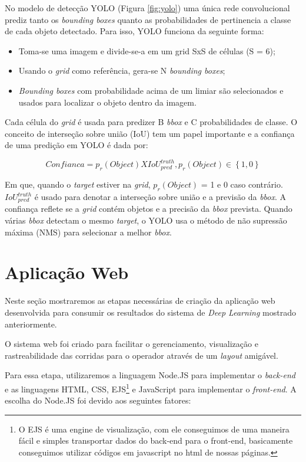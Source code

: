 No modelo de detecção YOLO (Figura \ref{fig:yolo}) uma única rede convolucional prediz tanto os \textit{bounding boxes} quanto as probabilidades de pertinencia a classe de cada objeto detectado. Para isso, YOLO funciona da seguinte forma:

\begin{itemize}
    \item Toma-se uma imagem e divide-se-a em um grid SxS de células (S = 6);
    \item Usando o \textit{grid} como referência, gera-se N \textit{bounding boxes};
    \item \textit{Bounding boxes} com probabilidade acima de um limiar são selecionados e usados para localizar o objeto dentro da imagem.
\end{itemize}

Cada célula do  \textit{grid} é usada para predizer B  \textit{bbox} e C probabilidades de classe. O conceito de interseção sobre união (IoU) tem um papel importante e a confiança de uma predição em YOLO é dada por:

\begin{equation}
    Confianca = p_r(Object) X IoU_{pred}^{truth} , p_r(Object) \in \left \{ 1\right.,\left.0\right \}
\end{equation}

Em que, quando o \textit{target} estiver na \textit{grid}, \(p_r(Object)\) = 1 e 0 caso contrário. \(IoU_{pred}^{truth}\) é usado para denotar a interseção sobre união e a previsão da \textit{bbox}. A confiança reflete se a \textit{grid} contém objetos e a precisão da \textit{bbox} prevista. Quando várias \textit{bbox} detectam o mesmo \textit{target}, o YOLO usa o método de não supressão máxima (NMS) para selecionar a melhor \textit{bbox}.


\section{Aplicação Web} \label{sec:web}

Neste seção mostraremos as etapas necessárias de criação da aplicação web desenvolvida para consumir os resultados do sistema de \textit{Deep Learning} mostrado anteriormente. 

O sistema web foi criado para facilitar o gerenciamento, visualização e rastreabilidade das corridas para o operador através de um \textit{layout} amigável.

Para essa etapa, utilizaremos a linguagem Node.JS para implementar o \textit{back-end} e as linguagens HTML, CSS, EJS\footnote{O EJS é uma engine de visualização, com ele conseguimos de uma maneira fácil e simples transportar dados do back-end para o front-end, basicamente conseguimos utilizar códigos em javascript no html de nossas páginas.} e JavaScript para implementar o \textit{front-end}. A escolha do Node.JS foi devido aos seguintes fatores:

